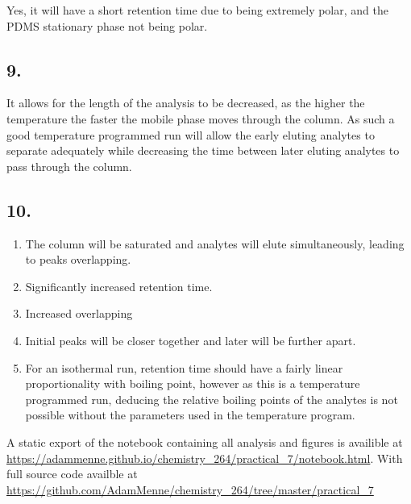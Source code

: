 \documentclass[a4paper, british]{article}
\begin{document}
Yes, it will have a short retention time due to being extremely polar, and the PDMS stationary phase not being polar.

\subsection*{9.}

It allows for the length of the analysis to be decreased, as the higher the temperature the faster the mobile phase moves through the column. As such a good temperature programmed run will allow the early eluting analytes to separate adequately while decreasing the time between later eluting analytes to pass through the column.

\subsection*{10.}

\begin{enumerate}[label={\alph*)}]
    \item The column will be saturated and analytes will elute simultaneously, leading to peaks overlapping.
    \item Significantly increased retention time.
    \item Increased overlapping
    \item Initial peaks will be closer together and later will be further apart.
    \item For an isothermal run, retention time should have a fairly linear proportionality with boiling point, however as this is a temperature programmed run, deducing the relative boiling points of the analytes is not possible without the parameters used in the temperature program.
\end{enumerate}

A static export of the notebook containing all analysis and figures is availible at \url{https://adammenne.github.io/chemistry_264/practical_7/notebook.html}. With full source code availble at \url{https://github.com/AdamMenne/chemistry_264/tree/master/practical_7}
\end{document}
